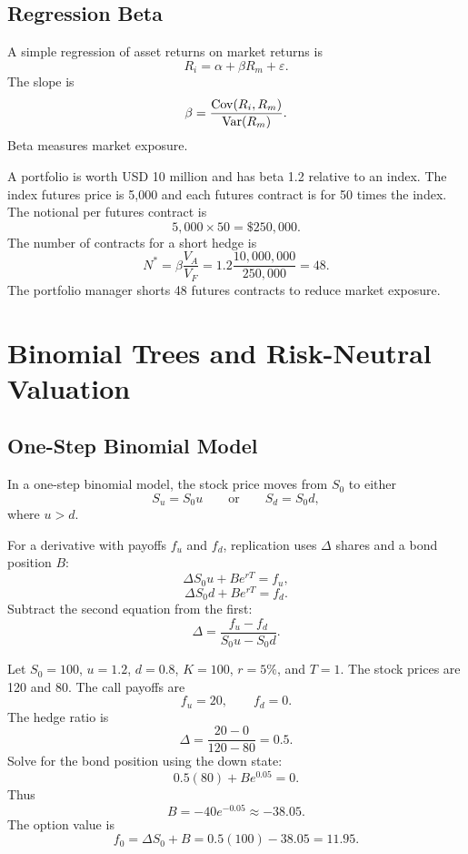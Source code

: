 \subsection{Regression Beta}

A simple regression of asset returns on market returns is
\[
    R_i = \alpha + \beta R_m + \varepsilon.
\]
The slope is
\[
    \beta=\frac{\operatorname{Cov}(R_i,R_m)}{\operatorname{Var}(R_m)}.
\]
Beta measures market exposure.

\begin{exmp}
A portfolio is worth USD 10 million and has beta 1.2 relative to an index. The
index futures price is 5,000 and each futures contract is for 50 times the index.
The notional per futures contract is
\[
    5{,}000\times 50=\$250{,}000.
\]
The number of contracts for a short hedge is
\[
    N^*=\beta\frac{V_A}{V_F}
    =
    1.2\frac{10{,}000{,}000}{250{,}000}
    =
    48.
\]
The portfolio manager shorts 48 futures contracts to reduce market exposure.
\end{exmp}

\section{Binomial Trees and Risk-Neutral Valuation}

\subsection{One-Step Binomial Model}

In a one-step binomial model, the stock price moves from $S_0$ to either
\[
    S_u=S_0u
    \qquad \text{or} \qquad
    S_d=S_0d,
\]
where $u>d$.

For a derivative with payoffs $f_u$ and $f_d$, replication uses $\Delta$ shares
and a bond position $B$:
\[
    \Delta S_0u + Be^{rT}=f_u,
\]
\[
    \Delta S_0d + Be^{rT}=f_d.
\]
Subtract the second equation from the first:
\[
    \Delta=\frac{f_u-f_d}{S_0u-S_0d}.
\]

\begin{exmp}
Let $S_0=100$, $u=1.2$, $d=0.8$, $K=100$, $r=5\%$, and $T=1$. The stock prices
are 120 and 80. The call payoffs are
\[
    f_u=20,\qquad f_d=0.
\]
The hedge ratio is
\[
    \Delta=\frac{20-0}{120-80}=0.5.
\]
Solve for the bond position using the down state:
\[
    0.5(80)+Be^{0.05}=0.
\]
Thus
\[
    B=-40e^{-0.05}\approx -38.05.
\]
The option value is
\[
    f_0=\Delta S_0+B=0.5(100)-38.05=11.95.
\]
\end{exmp}

